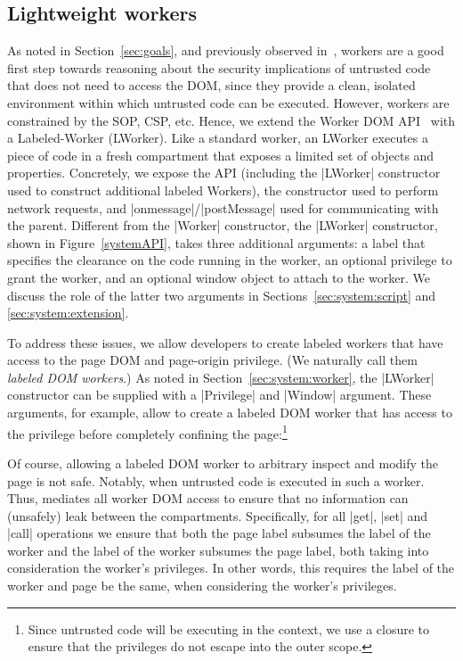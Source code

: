 \subsection{Lightweight workers}


As noted in Section~\ref{sec:goals}, and previously observed
in~\cite{Ingram:2012}, workers are a good first step towards reasoning
about the security implications of untrusted code that does not need
to access the DOM, since they provide a clean, isolated environment
within which untrusted code can be executed.
%
However, workers are constrained by the SOP, CSP, etc.
%
Hence, we extend the Worker DOM API~\cite{workers} with a
Labeled-Worker (LWorker).
%
Like a standard worker, an LWorker executes a piece of code in a fresh
compartment that exposes a limited set of objects and properties.
%
Concretely, we expose the \sys{} API (including the \js|LWorker|
constructor used to construct additional labeled Workers), the \xhr{}
constructor used to perform network requests, and
\js|onmessage|/\js|postMessage| used for communicating with the
parent.
%
Different from the \js|Worker| constructor, the \js|LWorker|
constructor, shown in Figure~\ref{systemAPI}, takes three additional
arguments: a label that specifies the clearance on the code running in
the worker, an optional privilege to grant the worker, and an optional
window object to attach to the worker.
%
We discuss the role of the latter two arguments in
Sections~\ref{sec:system:script} and \ref{sec:system:extension}.

To address these issues, we allow developers to create labeled workers that
have access to the page DOM and page-origin privilege.
%
(We naturally call them \emph{labeled DOM workers}.)
%
As noted in Section~\ref{sec:system:worker}, the \js|LWorker|
constructor can be supplied with a \js|Privilege| and \js|Window|
argument.
%
These arguments, for example, allow  to create a labeled DOM
worker that has access to the  privilege before completely
confining the page:\footnote{
  Since untrusted code will be executing in the context, we use a
  closure to ensure that the privileges do not escape into the outer
  scope.
}

Of course, allowing a labeled DOM worker to arbitrary inspect and
modify the page is not safe.
%
Notably, when untrusted code is executed in such a worker.
%
Thus, \sys{} mediates all worker DOM access to ensure that no information can
(unsafely) leak between the compartments.
%
Specifically, for all \js|get|, \js|set| and \js|call| operations we
ensure that both the page label subsumes the label of the worker 
and the label of the worker subsumes the page label,
both taking into consideration the worker's privileges.
%
In other words, this requires the label of the worker and page be the same,
when considering the worker's privileges.

